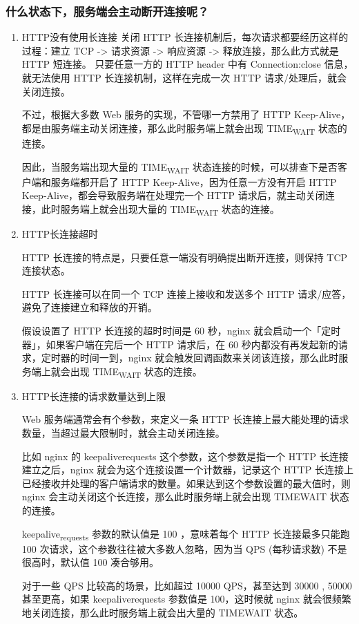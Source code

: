 \documentclass[11pt]{article}
\begin{document}
\subsubsection{什么状态下，服务端会主动断开连接呢？}
\label{sec:org2e65deb}
\begin{enumerate}
\item HTTP没有使用长连接
关闭 HTTP 长连接机制后，每次请求都要经历这样的过程：建立 TCP -> 请求资源 -> 响应资源 -> 释放连接，那么此方式就是 HTTP 短连接。
只要任意一方的 HTTP header 中有 Connection:close 信息，就无法使用 HTTP 长连接机制，这样在完成一次 HTTP 请求/处理后，就会关闭连接。

不过，根据大多数 Web 服务的实现，不管哪一方禁用了 HTTP Keep-Alive，都是由服务端主动关闭连接，那么此时服务端上就会出现 TIME\textsubscript{WAIT} 状态的连接。

因此，当服务端出现大量的 TIME\textsubscript{WAIT} 状态连接的时候，可以排查下是否客户端和服务端都开启了 HTTP Keep-Alive，因为任意一方没有开启 HTTP Keep-Alive，都会导致服务端在处理完一个 HTTP 请求后，就主动关闭连接，此时服务端上就会出现大量的 TIME\textsubscript{WAIT} 状态的连接。

\item HTTP长连接超时

HTTP 长连接的特点是，只要任意一端没有明确提出断开连接，则保持 TCP 连接状态。

HTTP 长连接可以在同一个 TCP 连接上接收和发送多个 HTTP 请求/应答，避免了连接建立和释放的开销。

假设设置了 HTTP 长连接的超时时间是 60 秒，nginx 就会启动一个「定时器」，如果客户端在完后一个 HTTP 请求后，在 60 秒内都没有再发起新的请求，定时器的时间一到，nginx 就会触发回调函数来关闭该连接，那么此时服务端上就会出现 TIME\textsubscript{WAIT} 状态的连接。

\item HTTP长连接的请求数量达到上限

Web 服务端通常会有个参数，来定义一条 HTTP 长连接上最大能处理的请求数量，当超过最大限制时，就会主动关闭连接。

比如 nginx 的 keepaliverequests 这个参数，这个参数是指一个 HTTP 长连接建立之后，nginx 就会为这个连接设置一个计数器，记录这个 HTTP 长连接上已经接收并处理的客户端请求的数量。如果达到这个参数设置的最大值时，则 nginx 会主动关闭这个长连接，那么此时服务端上就会出现 TIMEWAIT 状态的连接。

keepalive\textsubscript{requests} 参数的默认值是 100 ，意味着每个 HTTP 长连接最多只能跑 100 次请求，这个参数往往被大多数人忽略，因为当 QPS (每秒请求数) 不是很高时，默认值 100 凑合够用。

对于一些 QPS 比较高的场景，比如超过 10000 QPS，甚至达到 30000 , 50000 甚至更高，如果 keepaliverequests 参数值是 100，这时候就 nginx 就会很频繁地关闭连接，那么此时服务端上就会出大量的 TIMEWAIT 状态。
\end{enumerate}
\end{document}
